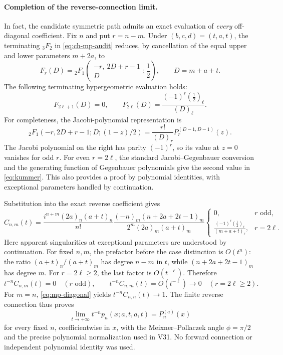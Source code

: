 \documentclass[11pt]{article}
\begin{document}
\paragraph{Completion of the reverse-connection limit.}
In fact, the candidate symmetric path admits an exact evaluation of \emph{every} off-diagonal coefficient. Fix $n$ and put $r=n-m$. Under $(b,c,d)=(t,a,t)$, the terminating ${}_3F_2$ in \eqref{eq:ch-mp-audit} reduces, by cancellation of the equal upper and lower parameters $m+2a$, to
\[
 F_r(D)={}_2F_1\!\left(\begin{matrix}-r,\ 2D+r-1\\D\end{matrix};\frac12\right),\qquad D=m+a+t.
\]
The following terminating hypergeometric evaluation holds:
\begin{equation}\label{eq:kummer}
 F_{2\ell+1}(D)=0,\qquad
 F_{2\ell}(D)=\frac{(-1)^\ell(\tfrac12)_\ell}{(D)_\ell}.
\end{equation}
For completeness, the Jacobi-polynomial representation is
\[
 {}_2F_1(-r,2D+r-1;D;(1-z)/2)
 =\frac{r!}{(D)_r}P_r^{(D-1,D-1)}(z).
\]
The Jacobi polynomial on the right has parity $(-1)^r$, so its value at $z=0$ vanishes for odd $r$. For even $r=2\ell$, the standard Jacobi--Gegenbauer conversion and the generating function of Gegenbauer polynomials give the second value in \eqref{eq:kummer}. This also provides a proof by polynomial identities, with exceptional parameters handled by continuation.

Substitution into the exact reverse coefficient gives
\begin{equation}\label{eq:exact-C}
 C_{n,m}(t)=\frac{i^{n+m}(2a)_n(a+t)_n}{n!}
 \frac{(-n)_m(n+2a+2t-1)_m}{2^m(2a)_m(a+t)_m}
 \begin{cases}
 0,&r\text{ odd},\\[2pt]
 \displaystyle\frac{(-1)^\ell(\tfrac12)_\ell}{(m+a+t)_\ell},&r=2\ell.
 \end{cases}
\end{equation}
Here apparent singularities at exceptional parameters are understood by continuation. For fixed $n,m$, the prefactor before the case distinction is $O(t^n)$: the ratio $(a+t)_n/(a+t)_m$ has degree $n-m$ in $t$, while $(n+2a+2t-1)_m$ has degree $m$. For $r=2\ell\ge2$, the last factor is $O(t^{-\ell})$. Therefore
\[
 t^{-n}C_{n,m}(t)=0\quad(r\text{ odd}),\qquad
 t^{-n}C_{n,m}(t)=O(t^{-\ell})\to0\quad(r=2\ell\ge2).
\]
For $m=n$, \eqref{eq:mp-diagonal} yields $t^{-n}C_{n,n}(t)\to1$. The finite reverse connection thus proves
\begin{equation}\label{eq:ch-mp-limit}
 \boxed{\displaystyle\lim_{t\to+\infty}t^{-n}p_n(x;a,t,a,t)=P_n^{(a)}(x)}
\end{equation}
for every fixed $n$, coefficientwise in $x$, with the Meixner--Pollaczek angle $\phi=\pi/2$ and the precise polynomial normalization used in V31. No forward connection or independent polynomial identity was used.
\end{document}
